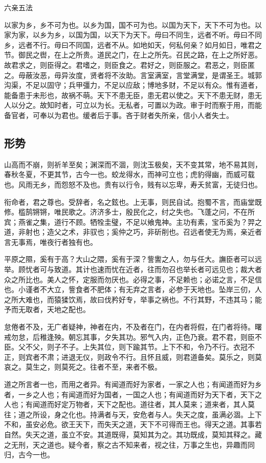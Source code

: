 \documentclass[]{article}
\begin{document}
六亲五法

以家为乡，乡不可为也。以乡为国，国不可为也。以国为天下，天下不可为也。以家为家，以乡为乡，以国为国，以天下为天下。毋曰不同生，远者不听。毋曰不同乡，远者不行。毋曰不同国，远者不从。如地如天，何私何亲？如月如日，唯君之节。御民之辔，在上之所贵。道民之门，在上之所先。召民之路，在上之所好恶。故君求之，则臣得之。君嗜之，则臣食之。君好之，则臣服之。君恶之，则臣匿之。毋蔽汝恶，毋异汝度，贤者将不汝助。言室满室，言堂满堂，是谓圣王。城郭沟渠，不足以固守；兵甲彊力，不足以应敌；博地多财，不足以有众。惟有道者，能备患于未形也，故祸不萌。天下不患无臣，患无君以使之。天下不患无财，患无人以分之。故知时者，可立以为长。无私者，可置以为政。审于时而察于用，而能备官者，可奉以为君也。缓者后于事。吝于财者失所亲，信小人者失士。

\hypertarget{header-n19}{%
\subsection{形势 }\label{header-n19}}

山高而不崩，则祈羊至矣；渊深而不涸，则沈玉极矣，天不变其常，地不易其则，春秋冬夏，不更其节，古今一也。蛟龙得水，而神可立也；虎豹得幽，而威可载也。风雨无乡，而怨怒不及也。贵有以行令，贱有以忘卑，寿夭贫富，无徒归也。

衔命者，君之尊也。受辞者，名之鉉也。上无事，则民自试。抱蜀不言，而庙堂既修。槛鹄锵锵，唯民歌之。济济多士，殷民化之，纣之失也。飞蓬之问，不在所宾；燕雀之集，道行不顾。牺牷圭璧，不足以飨鬼神。主功有素，宝币奚为？羿之道，非射也；造父之术，非驭也；奚仲之巧，非斫削也。召远者使无为焉，亲近者言无事焉，唯夜行者独有也。

平原之隰，奚有于高？大山之隈，奚有于深？訾讆之人，勿与任大。譕臣者可以远举。顾忧者可与致道。其计也速而忧在近者，往而勿召也举长者可远见也；裁大者众之所比也。美人之怀，定服而勿厌也。必得之事，不足赖也；必诺之言，不足信也。小谨者不大立，訾食者不肥体；有无弃之言者，必参于天地也。坠岸三仞，人之所大难也，而猿猱饮焉，故曰伐矜好专，举事之祸也。不行其野，不违其马；能予而无取者，天地之配也。

怠倦者不及，无广者疑神，神者在内，不及者在门，在内者将假，在门者将待。曙戒勿怠，后稚逢殃。朝忘其事，夕失其功。邪气入内，正色乃衰。君不君，则臣不臣。父不父，则子不子。上失其位，则下踰其节。上下不和，令乃不行。衣冠不正，则宾者不肃；进退无仪，则政令不行。且怀且威，则君道备矣。莫乐之，则莫哀之。莫生之，则莫死之。往者不至，来者不极。

道之所言者一也，而用之者异。有闻道而好为家者，一家之人也；有闻道而好为乡者，一乡之人也；有闻道而好为国者，一国之人也；有闻道而好为天下者，天下之人也；有闻道而好定万物者，天下之配也。道往者，其人莫来；道来者，其人莫往；道之所设，身之化也。持满者与天，安危者与人。失天之度，虽满必涸。上下不和，虽安必危。欲王天下，而失天之道，天下不可得而王也。得天之道。其事若自然。失天之道，虽立不安。其道既得，莫知其为之。其功既成，莫知其释之。藏之无刑，天之道也。疑今者，察之古不知来者，视之往，万事之生也，异趣而同归，古今一也。
\end{document}
